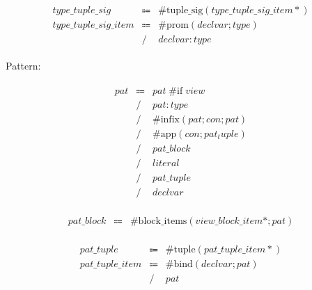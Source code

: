 \begin{align*}
    \begin{array}{rcll}
        \mathit{type\_tuple\_sig}
        &\Coloneq &\mathrm{\#tuple\_sig}(\mathit{type\_tuple\_sig\_item}{*}) \\
        \mathit{type\_tuple\_sig\_item}
        &\Coloneq &\mathrm{\#prom}(\mathit{declvar}; \mathit{type}) \\
        &\mathrel{/} &\mathit{declvar}: \mathit{type}
    \end{array}
\end{align*}

Pattern:

\begin{align*}
    \begin{array}{rcll}
        \mathit{pat}
        &\Coloneq &\mathit{pat}\; \mathrm{\#if}\; \mathit{view} \\
        &\mathrel{/} &\mathit{pat}: \mathit{type} \\
        &\mathrel{/} &\mathrm{\#infix}(\mathit{pat}; \mathit{con}; \mathit{pat}) \\
        &\mathrel{/} &\mathrm{\#app}(\mathit{con}; \mathit{pat_tuple}) \\
        &\mathrel{/} &\mathit{pat\_block} \\
        &\mathrel{/} &\mathit{literal} \\
        &\mathrel{/} &\mathit{pat\_tuple} \\
        &\mathrel{/} &\mathit{declvar}
    \end{array}
\end{align*}

\begin{align*}
    \begin{array}{rcll}
        \mathit{pat\_block}
        &\Coloneq &\mathrm{\#block\_items}(\mathit{view\_block\_item}{*}; \mathit{pat})
    \end{array}
\end{align*}

\begin{align*}
    \begin{array}{rcll}
        \mathit{pat\_tuple}
        &\Coloneq &\mathrm{\#tuple}(\mathit{pat\_tuple\_item}{*}) \\
        \mathit{pat\_tuple\_item}
        &\Coloneq &\mathrm{\#bind}(\mathit{declvar}; \mathit{pat}) \\
        &\mathrel{/} &\mathit{pat}
    \end{array}
\end{align*}

